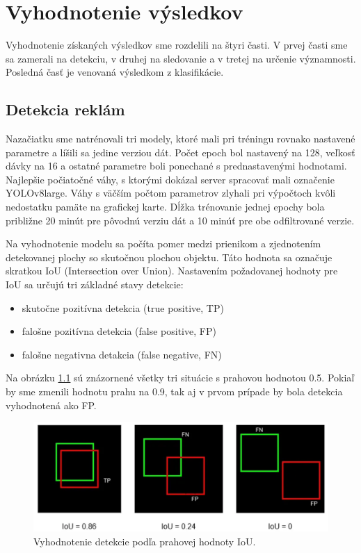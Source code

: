 \chapter{Vyhodnotenie výsledkov}\label{chap:results}

Vyhodnotenie získaných výsledkov sme rozdelili na štyri časti. V prvej časti sme sa zamerali na detekciu, v druhej na sledovanie a v tretej na určenie významnosti. Posledná časť je venovaná výsledkom z klasifikácie.

\section{Detekcia reklám}

Nazačiatku sme natrénovali tri modely, ktoré mali pri tréningu rovnako nastavené parametre a líšili sa jedine verziou dát. Počet epoch bol nastavený na 128, veľkosť dávky na 16 a ostatné parametre boli ponechané s prednastavenými hodnotami. Najlepšie počiatočné váhy, s ktorými dokázal server spracovať mali označenie YOLOv8large. Váhy s väčším počtom parametrov zlyhali pri výpočtoch kvôli nedostatku pamäte na grafickej karte. Dĺžka trénovanie jednej epochy bola približne 20 minút pre pôvodnú verziu dát a 10 minúť pre obe odfiltrované verzie.

Na vyhodnotenie modelu sa počíta pomer medzi prienikom a zjednotením detekovanej plochy so skutočnou plochou objektu. Táto hodnota sa označuje skratkou IoU (Intersection over Union). Nastavením požadovanej hodnoty pre IoU sa určujú tri základné stavy detekcie:

\begin{itemize}
  \item skutočne pozitívna detekcia (true positive, TP)
  \item falošne pozitívna detekcia (false positive, FP)
  \item falošne negativna detakcia (false negative, FN)
\end{itemize}

Na obrázku \ref{img:ious} sú znázornené všetky tri situácie s prahovou hodnotou 0.5. Pokiaľ by sme zmenili hodnotu prahu na 0.9, tak aj v prvom prípade by bola detekcia vyhodnotená ako FP.

\begin{figure}[ht]
    \centering
    \includegraphics[width=1\textwidth]{images/05/ious.png}
    \caption{Vyhodnotenie detekcie podľa prahovej hodnoty IoU.}
    \label{img:ious}
\end{figure}

